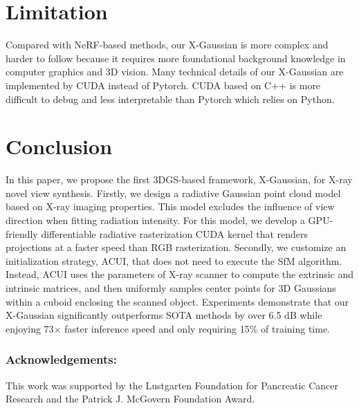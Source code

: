 \documentclass[runningheads]{llncs}
\begin{document}
\vspace{-3mm}
\section{Limitation}
\vspace{-2mm}
Compared with NeRF-based methods, our X-Gaussian is more complex and harder to follow because it requires more foundational background knowledge in computer graphics and 3D vision. Many technical details of our X-Gaussian are implemented by CUDA instead of Pytorch. CUDA based on C++ is more difficult to debug and less interpretable than Pytorch which relies on Python.

\vspace{-3mm}
\section{Conclusion}
\vspace{-2mm}
In this paper, we propose the first 3DGS-based framework, X-Gaussian, for X-ray novel view synthesis. Firstly, we design a radiative Gaussian point cloud model based on X-ray imaging properties. This model excludes the influence of view direction when fitting radiation intensity. For this model, we develop a GPU-friendly differentiable radiative rasterization CUDA kernel that renders projections at a faster speed than RGB rasterization. Secondly, we customize an initialization strategy, ACUI, that does not need to execute the SfM algorithm. Instead, ACUI uses the parameters of X-ray scanner to compute the extrinsic and intrinsic matrices, and then uniformly samples center points for 3D Gaussians within a cuboid enclosing the scanned object. Experiments demonstrate that our X-Gaussian significantly outperforms SOTA methods by over 6.5 dB while enjoying  73$\times$ faster inference speed and only requiring 15\% of training time.

\subsubsection{Acknowledgements:} This work was supported by the Lustgarten Foundation for Pancreatic Cancer Research and the Patrick J. McGovern Foundation Award.



\end{document}
